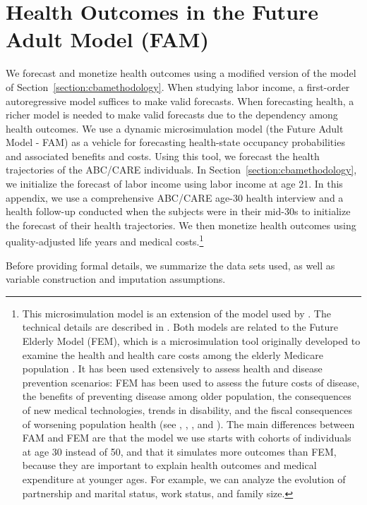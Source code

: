 \section{Health Outcomes in the Future Adult Model (FAM)} \label{appendix:health}

We forecast and monetize health outcomes using a modified version of the model of Section~\ref{section:cbamethodology}. When studying labor income, a first-order autoregressive model suffices to make valid forecasts. When forecasting health, a richer model is needed to make valid forecasts due to the dependency among health outcomes. We use a dynamic microsimulation model (the Future Adult Model - FAM) as a vehicle for forecasting health-state occupancy probabilities and associated benefits and costs. Using this tool, we forecast the health trajectories of the ABC/CARE individuals. In Section~\ref{section:cbamethodology}, we initialize the forecast of labor income using labor income at age 21. In this appendix, we use a comprehensive ABC/CARE  age-30 health interview and a health follow-up conducted when the subjects were in their mid-30s to initialize the forecast of their health trajectories. We then monetize health outcomes using quality-adjusted life years and medical costs.\footnote{This microsimulation model is an extension of the model used by \citet{Prados_etal_2015_How-Much-Can-Education}. The technical details are described in \citet{Goldman_etal_2015_Future-Adult-Model}. Both models are related to the Future Elderly Model (FEM), which is a microsimulation tool originally developed to examine the health and health care costs among the elderly Medicare population \citep{Goldman_etal_2004_RAND-Report_Health-Status-Elderly}. It has been used extensively to assess health and disease prevention scenarios: FEM has been used to assess the future costs of disease, the benefits of preventing disease among older population, the consequences of new medical technologies, trends in disability, and the fiscal consequences of worsening population health (see \citet{Goldman_etal_2004_RAND-Report_Health-Status-Elderly}, \citet{Lakdawalla_etal_2004_Health-and-Cost}, \citet{Goldman_etal_2005_HA}, and \citet{Zissimopoulos_etal_2014_Delaying-Alzheimers}). The main differences between FAM and FEM are that the model we use starts with cohorts of individuals at age 30 instead of 50, and that it simulates more outcomes than FEM, because they are important to explain health outcomes and medical expenditure at younger ages. For example, we can analyze the evolution of partnership and marital status, work status, and family size.}

\noindent Before providing formal details, we summarize the data sets used, as well as variable construction and imputation assumptions.




%

